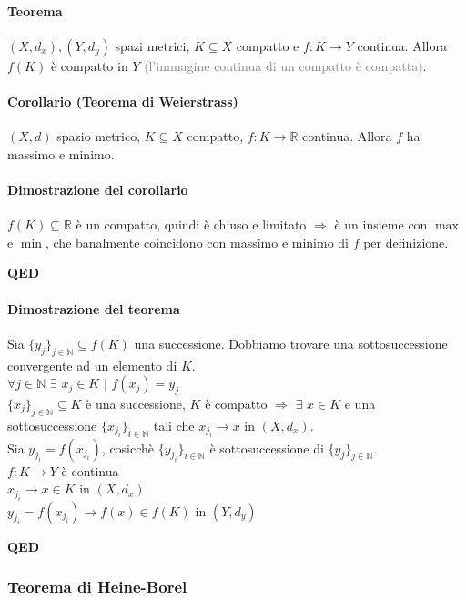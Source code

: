 \documentclass{article}
\newcommand{\R}{\mathbb{R}}
\newcommand{\N}{\mathbb{N}}
\begin{document}
\paragraph{{Teorema}}
$(X,d_x),(Y,d_y)$ spazi metrici, $K \subseteq X$ compatto e $f:K \rightarrow Y$ continua. Allora $f(K)$ è compatto in $Y$ \textcolor{grey}{(l'immagine continua di un compatto è compatta)}.

\paragraph{{Corollario (Teorema di Weierstrass)}}
$(X,d)$ spazio metrico, $K \subseteq X$ compatto, $f:K \rightarrow\R$ continua. Allora $f$ ha massimo e minimo.

\paragraph{Dimostrazione del corollario}
$f(K)\subseteq \R$ è un compatto, quindi è chiuso e limitato $\Rightarrow$ è un insieme con $\max$ e $\min$, che banalmente coincidono con massimo e minimo di $f$ per definizione. 
\begin{flushright}
\textbf{QED}
\end{flushright}

\paragraph{{Dimostrazione del teorema}}
Sia $\{y_j\}_{j\in\N}\subseteq f(K)$ una successione. Dobbiamo trovare una sottosuccessione convergente ad un elemento di $K$.\\
$\forall j \in \N \,\,\exists\,\, x_j\in K \,\,|\,\, f(x_j)=y_j$\\
$\{x_j\}_{j \in \N} \subseteq K$ è una successione, $K$ è compatto $\Rightarrow \,\, \exists\,\, x \in K$ e una sottosuccessione $\{x_{j_i}\}_{i\in \N}$ tali che $x_{j_i}\rightarrow x$ in $(X,d_x)$.\\
Sia $y_{j_i}=f(x_{j_i})$, cosicchè $\{y_{j_i}\}_{i\in\N}$ è sottosuccessione di $\{y_j\}_{j\in\N}$.\\
$f:K\rightarrow Y$ è continua\\
$x_{j_i}\rightarrow x \in K$ in $(X,d_x)$\\
$y_{j_i}=f(x_{j_i})\rightarrow f(x) \in f(K)$ in $(Y,d_y)$
\begin{flushright}
\textbf{QED}
\end{flushright}

\subsubsection{Teorema di Heine-Borel}
\end{document}
